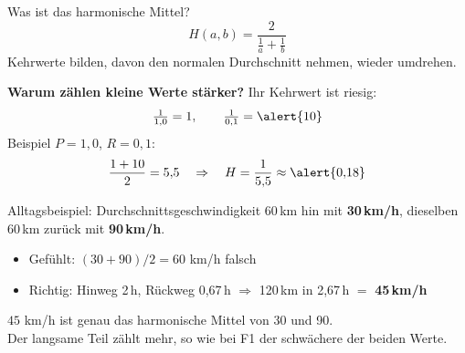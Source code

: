 \documentclass[aspectratio=169,11pt]{beamer}
\begin{document}
\begin{frame}{Was ist das harmonische Mittel?}
  \[
    H(a,b) = \frac{2}{\frac{1}{a} + \frac{1}{b}}
  \]
  Kehrwerte bilden, davon den normalen Durchschnitt nehmen, wieder umdrehen.

  \vspace{0.8em}
  \textbf{Warum zählen kleine Werte stärker?} Ihr Kehrwert ist riesig:
  \[
    \tfrac{1}{1{,}0} = 1, \qquad \tfrac{1}{0{,}1} = \alert{10}
  \]
  Beispiel \(P = 1{,}0\), \(R = 0{,}1\):
  \[
    \frac{1 + 10}{2} = 5{,}5 \quad\Rightarrow\quad H = \frac{1}{5{,}5} \approx \alert{0{,}18}
  \]
\end{frame}

\begin{frame}{Alltagsbeispiel: Durchschnittsgeschwindigkeit}
  60\,km hin mit \textbf{30\,km/h}, dieselben 60\,km zurück mit \textbf{90\,km/h}.

  \vspace{1em}
  \begin{itemize}
    \item Gefühlt: \((30 + 90)/2 = 60\) km/h \quad \alert{falsch}
    \item Richtig: Hinweg 2\,h, Rückweg 0{,}67\,h \(\Rightarrow\) 120\,km in 2{,}67\,h \(=\) \textbf{45\,km/h}
  \end{itemize}

  \vspace{1em}
  \(45\) km/h ist genau das harmonische Mittel von 30 und 90.\\[0.5em]
  Der langsame Teil zählt mehr, so wie bei F1 der \alert{schwächere} der beiden Werte.
\end{frame}
\end{document}
